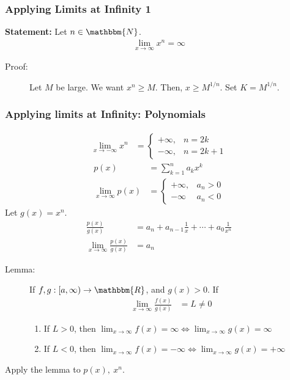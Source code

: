 \documentclass[10pt]{extarticle}
\newcommand{\N}{\mathbbm{N}}
\newcommand{\R}{\mathbbm{R}}
\begin{document}
    \subsubsection{Applying Limits at Infinity 1}%
      \textbf{Statement:} Let $n\in \N$.
      \begin{align*}
        \lim_{x\rightarrow\infty}x^{n} = \infty
      \end{align*}

      \begin{description}
        \item[Proof:] Let $M$ be large. We want $x^{n} \geq M$. Then, $x\geq M^{1/n}$. Set $K = M^{1/n}$.
      \end{description}
      \subsubsection{Applying limits at Infinity: Polynomials}%
    \begin{align*}
      \lim_{x\rightarrow -\infty}x^{n} &= \begin{cases}
        +\infty,&n = 2k\\
        -\infty,& n= 2k+1
      \end{cases}
    \end{align*}
    \begin{align*}
      p(x) &= \sum_{k=1}^{n}a_kx^k\\
      \lim_{x\rightarrow\infty}p(x) &= \begin{cases}
        +\infty,&a_n > 0\\
        -\infty&a_n < 0
      \end{cases}
    \end{align*}
    Let $g(x) = x^n$.
    \begin{align*}
      \frac{p(x)}{g(x)} &= a_n + a_{n-1}\frac{1}{x} + \cdots + a_{0}\frac{1}{x^n}\\
      \lim_{x\rightarrow\infty}\frac{p(x)}{g(x)} &= a_n
    \end{align*}
    \begin{description}
      \item[Lemma:]If $f,g: [a,\infty)\rightarrow \R$, and $g(x) > 0$. If
      \begin{align*}
        \lim_{x\rightarrow \infty}\frac{f(x)}{g(x)} &= L \neq 0
      \end{align*}
      \begin{enumerate}[(1)]
        \item If $L > 0$, then $\lim_{x\rightarrow\infty} f(x) = \infty \Leftrightarrow \lim_{x\rightarrow\infty}g(x) = \infty$
        \item If $L < 0$, then $\lim_{x\rightarrow\infty} f(x)= -\infty \Leftrightarrow \lim_{x\rightarrow\infty}g(x) = +\infty$
      \end{enumerate}
    \end{description}
    Apply the lemma to $p(x),~x^n$.
\end{document}
